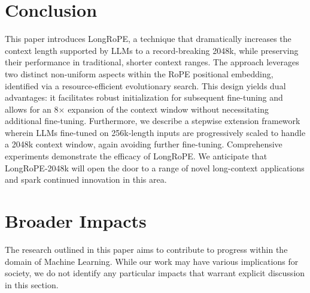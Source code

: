 \section{Conclusion}

This paper introduces LongRoPE, a technique that dramatically increases the context length supported by LLMs to a record-breaking 2048k, while preserving their performance in traditional, shorter context ranges. The approach leverages two distinct non-uniform aspects within the RoPE positional embedding, identified via a resource-efficient evolutionary search. This design yields dual advantages: it facilitates robust initialization for subsequent fine-tuning and allows for an 8$\times$ expansion of the context window without necessitating additional fine-tuning. Furthermore, we describe a stepwise extension framework wherein LLMs fine-tuned on 256k-length inputs are progressively scaled to handle a 2048k context window, again avoiding further fine-tuning. Comprehensive experiments demonstrate the efficacy of LongRoPE. We anticipate that LongRoPE-2048k will open the door to a range of novel long-context applications and spark continued innovation in this area.

\section*{Broader Impacts} The research outlined in this paper aims to contribute to progress within the domain of Machine Learning. While our work may have various implications for society, we do not identify any particular impacts that warrant explicit discussion in this section.

	\balance

